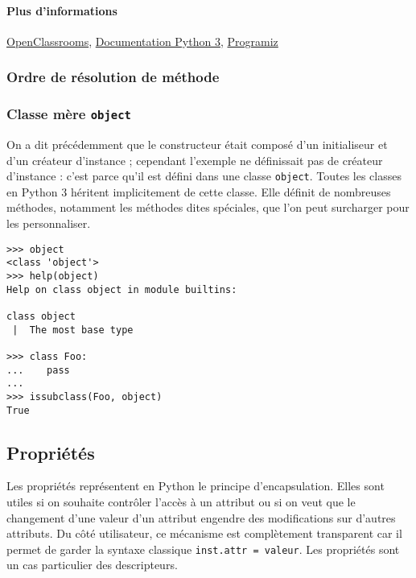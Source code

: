 \paragraph{Plus d'informations} \href{https://openclassrooms.com/courses/apprenez-a-programmer-en-python/l-heritage-9}{OpenClassrooms}, \href{https://docs.python.org/fr/3/tutorial/classes.html?highlight=héritage#inheritance}{Documentation Python 3}, \href{https://www.programiz.com/python-programming/inheritance}{Programiz}


\subsubsection{Ordre de résolution de méthode}

\subsubsection{Classe mère \texttt{object}}
On a dit précédemment que le constructeur était composé d'un initialiseur et d'un créateur d'instance ; cependant l'exemple ne définissait pas de créateur d'instance : c'est parce qu'il est défini dans une classe \texttt{object}. Toutes les classes en Python 3 héritent implicitement de cette classe. Elle définit de nombreuses méthodes, notamment les méthodes dites spéciales, que l'on peut surcharger pour les personnaliser.

\begin{verbatim}
>>> object
<class 'object'>
>>> help(object)
Help on class object in module builtins:

class object
 |  The most base type

>>> class Foo:
...    pass
...
>>> issubclass(Foo, object)
True
\end{verbatim}

\subsection{Propriétés}
\label{sec:proprietes}
Les propriétés représentent en Python le principe d'encapsulation. Elles sont utiles si on souhaite contrôler l'accès à un attribut ou si on veut que le changement d'une valeur d'un attribut engendre des modifications sur d'autres attributs. Du côté utilisateur, ce mécanisme est complètement transparent car il permet de garder la syntaxe classique \texttt{inst.attr = valeur}. Les propriétés sont un cas particulier des descripteurs.\bigskip

